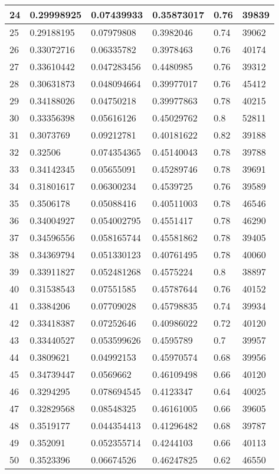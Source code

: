 \begin{longtable}{|l|l|l|l|l|l|}
24 & 0.29998925 & 0.07439933 & 0.35873017 & 0.76 & 39839 \\ \hline 
25 & 0.29188195 & 0.07979808 & 0.3982046 & 0.74 & 39062 \\ \hline 
26 & 0.33072716 & 0.06335782 & 0.3978463 & 0.76 & 40174 \\ \hline 
27 & 0.33610442 & 0.047283456 & 0.4480985 & 0.76 & 39312 \\ \hline 
28 & 0.30631873 & 0.048094664 & 0.39977017 & 0.76 & 45412 \\ \hline 
29 & 0.34188026 & 0.04750218 & 0.39977863 & 0.78 & 40215 \\ \hline 
30 & 0.33356398 & 0.05616126 & 0.45029762 & 0.8 & 52811 \\ \hline 
31 & 0.3073769 & 0.09212781 & 0.40181622 & 0.82 & 39188 \\ \hline 
32 & 0.32506 & 0.074354365 & 0.45140043 & 0.78 & 39788 \\ \hline 
33 & 0.34142345 & 0.05655091 & 0.45289746 & 0.78 & 39691 \\ \hline 
34 & 0.31801617 & 0.06300234 & 0.4539725 & 0.76 & 39589 \\ \hline 
35 & 0.3506178 & 0.05088416 & 0.40511003 & 0.78 & 46546 \\ \hline 
36 & 0.34004927 & 0.054002795 & 0.4551417 & 0.78 & 46290 \\ \hline 
37 & 0.34596556 & 0.058165744 & 0.45581862 & 0.78 & 39405 \\ \hline 
38 & 0.34369794 & 0.051330123 & 0.40761495 & 0.78 & 40060 \\ \hline 
39 & 0.33911827 & 0.052481268 & 0.4575224 & 0.8 & 38897 \\ \hline 
40 & 0.31538543 & 0.07551585 & 0.45787644 & 0.76 & 40152 \\ \hline 
41 & 0.3384206 & 0.07709028 & 0.45798835 & 0.74 & 39934 \\ \hline 
42 & 0.33418387 & 0.07252646 & 0.40986022 & 0.72 & 40120 \\ \hline 
43 & 0.33440527 & 0.053599626 & 0.4595789 & 0.7 & 39957 \\ \hline 
44 & 0.3809621 & 0.04992153 & 0.45970574 & 0.68 & 39956 \\ \hline 
45 & 0.34739447 & 0.0569662 & 0.46109498 & 0.66 & 40120 \\ \hline 
46 & 0.3294295 & 0.078694545 & 0.4123347 & 0.64 & 40025 \\ \hline 
47 & 0.32829568 & 0.08548325 & 0.46161005 & 0.66 & 39605 \\ \hline 
48 & 0.3519177 & 0.044354413 & 0.41296482 & 0.68 & 39787 \\ \hline 
49 & 0.352091 & 0.052355714 & 0.4244103 & 0.66 & 40113 \\ \hline 
50 & 0.3523396 & 0.06674526 & 0.46247825 & 0.62 & 46550 \\ \hline 
\end{longtable}